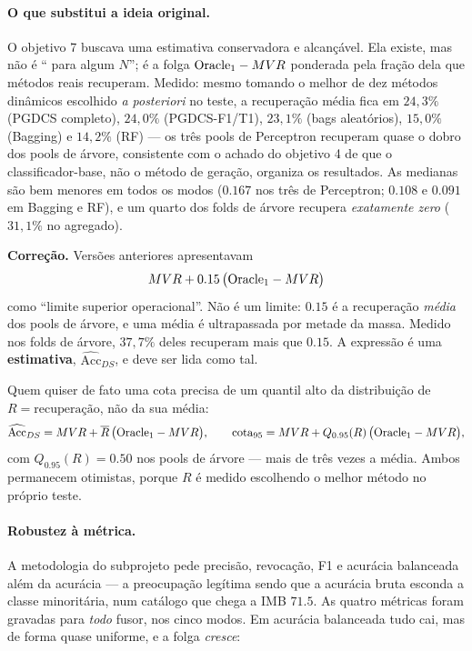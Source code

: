 \paragraph{O que substitui a ideia original.} O objetivo 7 buscava uma estimativa
conservadora e alcançável. Ela existe, mas não é `` para algum $N$''; é a folga
$\text{Oracle}_{1}-MVR$ ponderada pela fração dela que métodos reais recuperam. Medido: mesmo
tomando o melhor de dez métodos dinâmicos escolhido \emph{a posteriori} no teste, a
recuperação média fica em $24{,}3\%$ (PGDCS completo), $24{,}0\%$ (PGDCS-F1/T1),
$23{,}1\%$ (bags aleatórios), $15{,}0\%$ (Bagging) e $14{,}2\%$ (RF) --- os três
pools de Perceptron recuperam quase o dobro dos pools de árvore, consistente com o
achado do objetivo 4 de que o classificador-base, não o método de geração, organiza
os resultados. As medianas são bem menores em todos os modos ($0.167$ nos três de
Perceptron; $0.108$ e $0.091$ em Bagging e RF), e um quarto dos folds de árvore
recupera \emph{exatamente zero} ($31{,}1\%$ no agregado).

\textbf{Correção.} Versões anteriores apresentavam
\begin{equation}
MVR + 0.15\,\bigl(\text{Oracle}_{1}-MVR\bigr)
\end{equation}
como ``limite superior operacional''. Não é um limite: $0.15$ é a recuperação
\emph{média} dos pools de árvore, e uma média é ultrapassada por metade da massa.
Medido nos folds de árvore, $37{,}7\%$ deles recuperam mais que $0.15$. A expressão é
uma \textbf{estimativa}, $\widehat{\mathrm{Acc}}_{DS}$, e deve ser lida como tal.

Quem quiser de fato uma cota precisa de um quantil alto da distribuição de
$R=\text{recuperação}$, não da sua média:
\begin{equation}
\widehat{\mathrm{Acc}}_{DS} = MVR + \overline{R}\,\bigl(\text{Oracle}_{1}-MVR\bigr),
\qquad
\mathrm{cota}_{95} = MVR + Q_{0.95}(R)\,\bigl(\text{Oracle}_{1}-MVR\bigr),
\end{equation}
com $Q_{0.95}(R)=0.50$ nos pools de árvore --- mais de três vezes a média. Ambos
permanecem otimistas, porque $R$ é medido escolhendo o melhor método no próprio
teste.

\paragraph{Robustez à métrica.} A metodologia do subprojeto pede precisão, revocação,
F1 e acurácia balanceada além da acurácia --- a preocupação legítima sendo que a
acurácia bruta esconda a classe minoritária, num catálogo que chega a IMB $71.5$. As
quatro métricas foram gravadas para \emph{todo} fusor, nos cinco modos. Em acurácia
balanceada tudo cai, mas de forma quase uniforme, e a folga \emph{cresce}:

